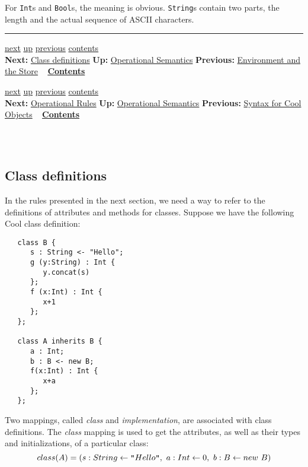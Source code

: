 \documentclass[]{article}
\begin{document}
For \texttt{Int}s and \texttt{Bool}s, the meaning is obvious.
\texttt{String}s contain two parts, the length and the actual sequence
of ASCII characters.

\begin{center}\rule{3in}{0.4pt}\end{center}

\href{node47.html}{next} \href{node44.html}{up}
\href{node45.html}{previous} \href{node1.html}{contents} \\
\textbf{Next:} \href{node47.html}{Class definitions} \textbf{Up:}
\href{node44.html}{Operational Semantics} \textbf{Previous:}
\href{node45.html}{Environment and the Store} ~
\textbf{\href{node1.html}{Contents}}

\href{node48.html}{next} \href{node44.html}{up}
\href{node46.html}{previous} \href{node1.html}{contents} \\
\textbf{Next:} \href{node48.html}{Operational Rules} \textbf{Up:}
\href{node44.html}{Operational Semantics} \textbf{Previous:}
\href{node46.html}{Syntax for Cool Objects} ~
\textbf{\href{node1.html}{Contents}} \\ \\

\subsection{\\ Class definitions}

In the rules presented in the next section, we need a way to refer to
the definitions of attributes and methods for classes. Suppose we have
the following Cool class definition:

\begin{verbatim}
   class B {
      s : String <- "Hello";
      g (y:String) : Int {
         y.concat(s)
      };
      f (x:Int) : Int {
         x+1
      };
   };

   class A inherits B {
      a : Int;
      b : B <- new B;
      f(x:Int) : Int {
         x+a
      };
   };
\end{verbatim}

Two mappings, called \emph{class} and \emph{implementation}, are
associated with class definitions. The \emph{class} mapping is used to
get the attributes, as well as their types and initializations, of a
particular class: \\

\begin{displaymath}
class(A) = (s : String \leftarrow \mbox {\tt ''}Hello \mbox {\tt ''},\ a : Int
\leftarrow 0,\ b : B \leftarrow new\ B)
\end{displaymath}
\end{document}
